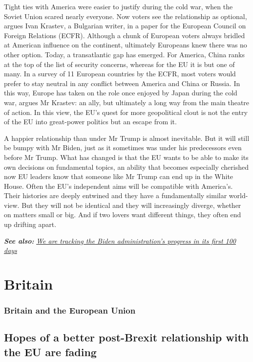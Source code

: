 \documentclass{article}
\begin{document}
Tight ties with America were easier to justify during the cold war, when the Soviet Union scared nearly everyone. Now voters see the relationship as optional, argues Ivan Krastev, a Bulgarian writer, in a paper for the European Council on Foreign Relations (ECFR). Although a chunk of European voters always bridled at American influence on the continent, ultimately Europeans knew there was no other option. Today, a transatlantic gap has emerged. For America, China ranks at the top of the list of security concerns, whereas for the EU it is but one of many. In a survey of 11 European countries by the ECFR, most voters would prefer to stay neutral in any conflict between America and China or Russia. In this way, Europe has taken on the role once enjoyed by Japan during the cold war, argues Mr Krastev: an ally, but ultimately a long way from the main theatre of action. In this view, the EU's quest for more geopolitical clout is not the entry of the EU into great-power politics but an escape from it. 

A happier relationship than under Mr Trump is almost inevitable. But it will still be bumpy with Mr Biden, just as it sometimes was under his predecessors even before Mr Trump. What has changed is that the EU wants to be able to make its own decisions on fundamental topics, an ability that becomes especially cherished now EU leaders know that someone like Mr Trump can end up in the White House. Often the EU's independent aims will be compatible with America's. Their histories are deeply entwined and they have a fundamentally similar world-view. But they will not be identical and they will increasingly diverge, whether on matters small or big. And if two lovers want different things, they often end up drifting apart. {} 

\textbf{\emph{See also:}} \href{https://www.economist.com/tracking-joe-biden}{\emph{We are tracking the Biden administration's progress in its first 100 days}} 
\clearpage
\section{Britain }
\subsubsection{Britain and the European Union }
\subsection{Hopes of a better post-Brexit relationship with the EU are fading }
\end{document}
